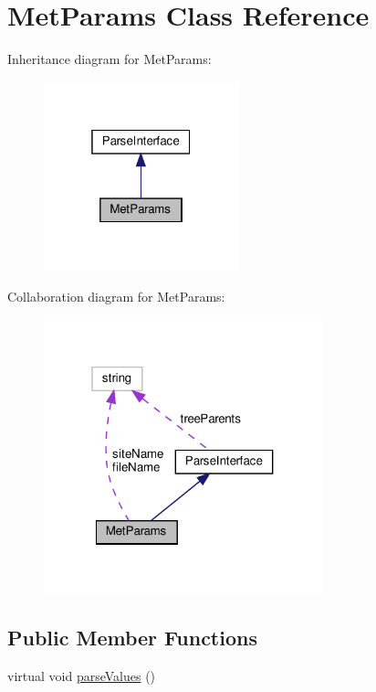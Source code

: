\hypertarget{classMetParams}{}\section{Met\+Params Class Reference}
\label{classMetParams}


Inheritance diagram for Met\+Params\+:
\nopagebreak
\begin{figure}[H]
\begin{center}
\leavevmode
\includegraphics[width=160pt]{classMetParams__inherit__graph}
\end{center}
\end{figure}


Collaboration diagram for Met\+Params\+:
\nopagebreak
\begin{figure}[H]
\begin{center}
\leavevmode
\includegraphics[width=229pt]{classMetParams__coll__graph}
\end{center}
\end{figure}
\subsection*{Public Member Functions}
\begin{DoxyCompactItemize}
\item 
virtual void \hyperlink{classMetParams_ad40706e0668d5e0248f39cc3a480b0af}{parse\+Values} ()
\end{DoxyCompactItemize}
